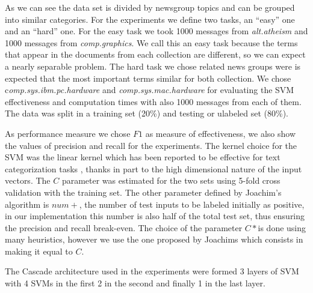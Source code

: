 As we can see the data set is divided by newsgroup topics and can
be grouped into similar categories. For the experiments we define
two tasks, an {}``easy'' one and an {}``hard'' one. For the easy
task we took 1000 messages from \emph{alt.atheism }and 1000 messages
from \emph{comp.graphics}. We call this an easy task because the terms
that appear in the documents from each collection are different, so
we can expect a nearly separable problem. The hard task we chose related
news groups were is expected that the most important terms similar
for both collection. We chose c\emph{omp.sys.ibm.pc.hardware} and
\emph{comp.sys.mac.hardware }for evaluating the SVM effectiveness
and computation times with also 1000 messages from each of them. The
data was split in a training set (20\%) and testing or ulabeled set
(80\%). 

As performance measure we chose $F1$ as measure of effectiveness,
we also show the values of precision and recall for the experiments.
The kernel choice for the SVM was the linear kernel which has been
reported to be effective for text categorization tasks \cite{Joachims99c,DumaisPHS98},
thanks in part to the high dimensional nature of the input vectors.
The $C$ parameter was estimated for the two sets using 5-fold cross
validation with the training set. The other parameter defined by Joachim's
algorithm is $num+$, the number of test inputs to be labeled initially
as positive, in our implementation this number is also half of the
total test set, thus ensuring the precision and recall break-even.
The choice of the parameter $C*$is done using many heuristics, however
we use the one proposed by Joachims which consists in making it equal
to $C$. %
%

{}

The Cascade architecture used in the experiments were formed 3 layers
of SVM with 4 SVMs in the first 2 in the second and finally 1 in the
last layer.

